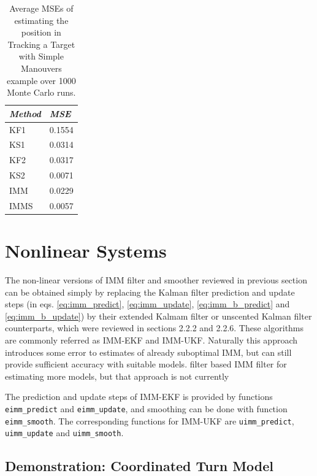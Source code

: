 % 
%  
\begin{table}
\begin{center}
\begin{tabular}{|l|l|} \hline {\it Method}&{\it MSE } \\ \hline KF1 &
0.1554 \\ KS1 & 0.0314 \\ KF2 & 0.0317 \\ KS2 & 0.0071 \\ IMM & 0.0229
\\ IMMS & 0.0057 \\ \hline
\end{tabular}
\caption{Average MSEs of estimating the position in Tracking a Target
with Simple Manouvers example over 1000 Monte Carlo runs.}
\label{table:imm_rmse}
\end{center}
\end{table}
%

\section{Nonlinear Systems}

The non-linear versions of IMM filter and smoother reviewed in
previous section can be obtained simply by replacing the Kalman filter
prediction and update steps (in eqs. \eqref{eq:imm_predict},
\eqref{eq:imm_update}, \eqref{eq:imm_b_predict} and
\eqref{eq:imm_b_update}) by their extended Kalmam filter or unscented
Kalman filter counterparts, which were reviewed in sections 2.2.2 and
2.2.6. These algorithms are commonly referred as IMM-EKF and
IMM-UKF. Naturally this approach introduces some error to estimates of
already suboptimal IMM, but can still provide sufficient accuracy with
suitable models. %
filter based IMM filter for estimating more %
models, but that approach is not currently %


The prediction and update steps of IMM-EKF is provided by functions
\texttt{eimm\_predict} and \texttt{eimm\_update}, and smoothing can be
done with function \texttt{eimm\_smooth}. The corresponding functions
for IMM-UKF are \texttt{uimm\_predict}, \texttt{uimm\_update} and
\texttt{uimm\_smooth}.


\subsection{Demonstration: Coordinated Turn Model}

